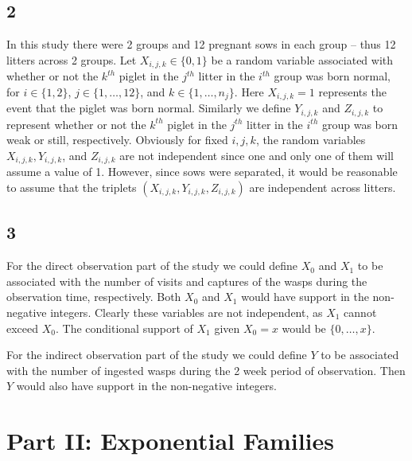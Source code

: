 \documentclass[12pt]{article}
\begin{document}
\subsection*{2}
In this study there were 2 groups and 12 pregnant sows in each group -- thus 12 litters across 2 groups. Let $X_{i,j,k} \in \{0,1\}$ be a random
variable associated with whether or not
the $k^{th}$ piglet in the $j^{th}$ litter in the $i^{th}$ group was born normal, for $i \in \{1, 2\}$, $j \in \{1, \dots, 12\}$, and $k \in \{1,
\dots, n_{j}\}$. Here $X_{i,j,k} = 1$ represents the event that the piglet was born normal. Similarly we define $Y_{i,j,k}$ and $Z_{i,j,k}$ to represent whether or not 
the $k^{th}$ piglet in the $j^{th}$ litter in the $i^{th}$ group was born weak or still, respectively. Obviously for fixed $i, j, k$, the random
variables $X_{i,j,k}, Y_{i,j,k}$, and $Z_{i,j,k}$ are not independent since one and only one of them will assume a value of 1. However, since sows
were separated, it would be reasonable to assume that the triplets $(X_{i,j,k}, Y_{i,j,k}, Z_{i,j,k})$ are independent across litters.



\subsection*{3}
For the direct observation part of the study we could define $X_{0}$ and $X_{1}$ to be associated with the number of visits and captures of the wasps 
during the observation time, respectively. Both $X_0$ and $X_1$ would have support in the non-negative integers.
Clearly these variables are not independent, as $X_1$ cannot exceed $X_0$. The conditional support of $X_1$ given $X_0 = x$ would be $\{0,\dots, x\}$.

For the indirect observation part of the study we could define $Y$ to be associated with the number of ingested wasps during the 2 week period of
observation. Then $Y$ would also have support in the non-negative integers. 


\newpage
\section*{Part II: Exponential Families}
\end{document}
